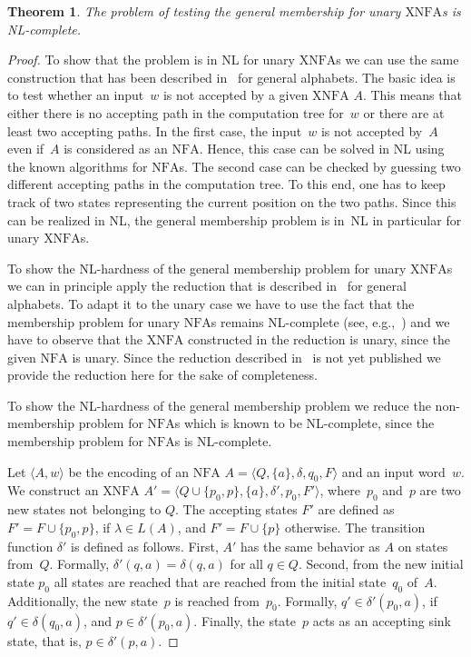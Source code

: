 \documentclass[final,copyright,noderivs]{eptcs}
\theoremstyle{plain}
\newtheorem{theorem}{Theorem}
\theoremstyle{definition}
\newcommand{\nfa}{\textrm{NFA}}
\newcommand{\xnfa}{\textrm{XNFA}}
\begin{document}
\begin{theorem}\label{theo:compmember:unary}
The problem of testing the general membership for unary $\xnfa$s 
is {\em \textsf{NL}}-complete.
\end{theorem}

\begin{proof}
To show that the problem is in {\sf NL} for unary $\xnfa$s we can use the same construction
that has been described in~\cite{kutrib:2023:coenfa:proc,kutrib:2023:coenfa} for general alphabets.
The basic idea is to test whether an input~$w$ is not accepted by a given $\xnfa$ $A$. This means
that either there is no accepting path in the computation tree for~$w$ or there are at least two
accepting paths. In the first case, the input~$w$ is not accepted by~$A$ even if~$A$ is considered as
an $\nfa$. Hence, this case can be solved in {\sf NL} using the known algorithms for $\nfa$s.
The second case can be checked by guessing two different accepting paths in the computation tree.
To this end, one has to keep track of two states representing the current position on the two paths.
Since this can be realized in {\sf NL}, the general membership problem is in~{\sf NL} in particular for 
unary $\xnfa$s.

To show the \textsf{NL}-hardness of the general membership problem for unary $\xnfa$s 
we can in principle apply the reduction that is described in~\cite{kutrib:2023:coenfa} for general alphabets.
To adapt it to the unary case we have to use the fact that the membership problem for unary $\nfa$s remains \textsf{NL}-complete 
(see, e.g.,~\cite{jones:1975:sbracp}) and we have to observe that the $\xnfa$ constructed in the reduction is unary, since the given $\nfa$ is unary.
Since the reduction described in~\cite{kutrib:2023:coenfa} is not yet published we provide the reduction here
for the sake of completeness.

To show the \textsf{NL}-hardness of the general membership problem 
we reduce the non-membership problem for $\nfa$s
which is known to be \textsf{NL}-complete, since
the membership problem for $\nfa$s is \textsf{NL}-complete.

Let $\langle A,w \rangle$ be the encoding of an $\nfa$
$A=\langle Q, \{a\}, \delta, q_0, F \rangle$ and an input word~$w$.
We construct an $\xnfa$ $A'=\langle Q \cup \{p_0,p\}, \{a\}, \delta', p_0, F' \rangle$,
where~$p_0$ and~$p$ are two new states not belonging to $Q$. The accepting states $F'$ are
defined as $F'=F \cup \{p_0,p\}$, if $\lambda \in L(A)$, and $F'=F \cup \{p\}$ otherwise.
The transition function $\delta'$ is defined as follows.
First, $A'$ has the same behavior as $A$ on states from~$Q$.
Formally, $\delta'(q,a)=\delta(q,a)$ for all $q \in Q$.
Second, from the new initial state $p_0$ all states are reached that are
reached from the initial state~$q_0$ of~$A$. Additionally, the new state~$p$
is reached from~$p_0$.
Formally, $q' \in \delta'(p_0,a)$, if $q' \in \delta(q_0,a)$,
and $p \in \delta'(p_0,a)$.
Finally, the state~$p$ acts as an accepting sink state, that is, $p \in \delta'(p,a)$.


\end{proof}
\end{document}
